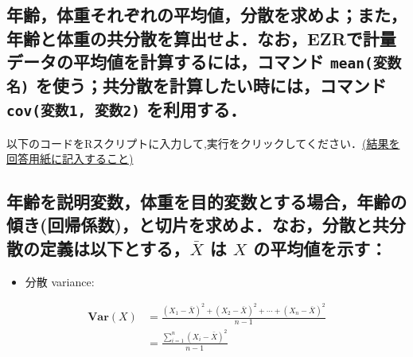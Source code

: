 \documentclass[11pt,]{problemset}
\newenvironment{Shaded}{\begin{snugshade}}{\end{snugshade}}
\newcommand{\CommentTok}[1]{\textcolor[rgb]{0.56,0.35,0.01}{\textit{#1}}}
\newcommand{\KeywordTok}[1]{\textcolor[rgb]{0.13,0.29,0.53}{\textbf{#1}}}
\newcommand{\NormalTok}[1]{#1}
\newcommand{\OperatorTok}[1]{\textcolor[rgb]{0.81,0.36,0.00}{\textbf{#1}}}
\providecommand{\tightlist}{%
  \setlength{\itemsep}{0pt}\setlength{\parskip}{0pt}}
\begin{document}
\hypertarget{ezr-mean--cov1-2-}{%
\subsection{\texorpdfstring{年齢，体重それぞれの平均値，分散を求めよ；また，年齢と体重の共分散を算出せよ．なお，EZRで計量データの平均値を計算するには，コマンド
\texttt{mean(変数名)} を使う；共分散を計算したい時には，コマンド
\texttt{cov(変数1,\ 変数2)}
を利用する．}{年齢，体重それぞれの平均値，分散を求めよ；また，年齢と体重の共分散を算出せよ．なお，EZRで計量データの平均値を計算するには，コマンド mean(変数名) を使う；共分散を計算したい時には，コマンド cov(変数1, 変数2) を利用する．}}\label{ezr-mean--cov1-2-}}

以下のコードをRスクリプトに入力して,実行をクリックしてください．\underline{(結果を回答用紙に記入すること)}

\begin{Shaded}
\end{Shaded}

\newpage

\hypertarget{barx--x-}{%
\subsection{\texorpdfstring{年齢を説明変数，体重を目的変数とする場合，年齢の傾き(回帰係数)，と切片を求めよ．なお，分散と共分散の定義は以下とする，\(\bar{X}\)
は \(X\)
の平均値を示す：}{年齢を説明変数，体重を目的変数とする場合，年齢の傾き(回帰係数)，と切片を求めよ．なお，分散と共分散の定義は以下とする，\textbackslash{}bar\{X\} は X の平均値を示す：}}\label{barx--x-}}

\begin{itemize}
\tightlist
\item
  分散 variance:
\end{itemize}

\[
\begin{aligned}
\mathbf{Var}(X) & = \frac{(X_1-\bar{X})^2+(X_2-\bar{X})^2+\cdots+(X_n-\bar{X})^2}{n - 1} \\
                & = \frac{\sum_{i=1}^n(X_i-\bar{X})^2}{n -1}
\end{aligned}
\]
\end{document}
